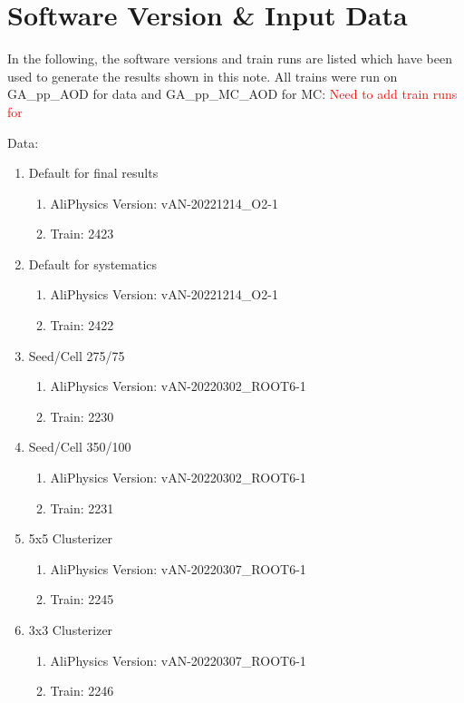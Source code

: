 \section{Software Version \& Input Data}
\label{sec:software}
In the following, the software versions and train runs are listed which have been used to generate the results shown in this note. All trains were run on GA\_pp\_AOD for data and GA\_pp\_MC\_AOD for MC: \textcolor{red}{Need to add train runs for \pPb}

Data:
\begin{enumerate}
    \item Default for final results
    \begin{enumerate}
        \item AliPhysics Version: vAN-20221214\_O2-1
        \item Train: 2423
    \end{enumerate}
    \item Default for systematics
    \begin{enumerate}
        \item AliPhysics Version: vAN-20221214\_O2-1
        \item Train: 2422
    \end{enumerate}
    \item Seed/Cell 275/75
    \begin{enumerate}
        \item AliPhysics Version: vAN-20220302\_ROOT6-1
        \item Train: 2230
    \end{enumerate}
    \item Seed/Cell 350/100
    \begin{enumerate}
        \item AliPhysics Version: vAN-20220302\_ROOT6-1
        \item Train: 2231
    \end{enumerate}
    \item 5x5 Clusterizer
    \begin{enumerate}
        \item AliPhysics Version: vAN-20220307\_ROOT6-1
        \item Train: 2245
    \end{enumerate}
    \item 3x3 Clusterizer
    \begin{enumerate}
        \item AliPhysics Version: vAN-20220307\_ROOT6-1
        \item Train: 2246

\end{enumerate}
\end{enumerate}
